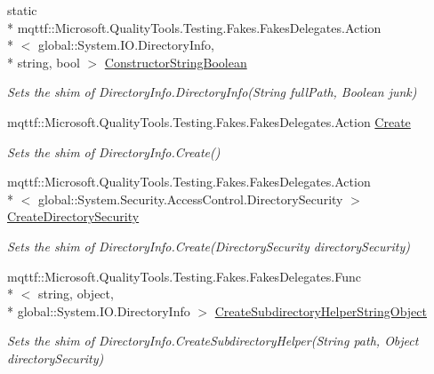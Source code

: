 \begin{DoxyCompactItemize}
static \\*
mqttf\-::\-Microsoft.\-Quality\-Tools.\-Testing.\-Fakes.\-Fakes\-Delegates.\-Action\\*
$<$ global\-::\-System.\-I\-O.\-Directory\-Info, \\*
string, bool $>$ \hyperlink{class_system_1_1_i_o_1_1_fakes_1_1_shim_directory_info_add65e978e8c4420be658b0a033a08abd}{Constructor\-String\-Boolean}
\begin{DoxyCompactList}\small\item\em Sets the shim of Directory\-Info.\-Directory\-Info(\-String full\-Path, Boolean junk)\end{DoxyCompactList}\item 
mqttf\-::\-Microsoft.\-Quality\-Tools.\-Testing.\-Fakes.\-Fakes\-Delegates.\-Action \hyperlink{class_system_1_1_i_o_1_1_fakes_1_1_shim_directory_info_a4253f2442987aa323efab668c26c50d3}{Create}
\begin{DoxyCompactList}\small\item\em Sets the shim of Directory\-Info.\-Create()\end{DoxyCompactList}\item 
mqttf\-::\-Microsoft.\-Quality\-Tools.\-Testing.\-Fakes.\-Fakes\-Delegates.\-Action\\*
$<$ global\-::\-System.\-Security.\-Access\-Control.\-Directory\-Security $>$ \hyperlink{class_system_1_1_i_o_1_1_fakes_1_1_shim_directory_info_ad7279d80b38c229bc09ab4c10b5c8f58}{Create\-Directory\-Security}
\begin{DoxyCompactList}\small\item\em Sets the shim of Directory\-Info.\-Create(\-Directory\-Security directory\-Security)\end{DoxyCompactList}\item 
mqttf\-::\-Microsoft.\-Quality\-Tools.\-Testing.\-Fakes.\-Fakes\-Delegates.\-Func\\*
$<$ string, object, \\*
global\-::\-System.\-I\-O.\-Directory\-Info $>$ \hyperlink{class_system_1_1_i_o_1_1_fakes_1_1_shim_directory_info_a049fe4eb275cab9150a3c9499647a3a3}{Create\-Subdirectory\-Helper\-String\-Object}
\begin{DoxyCompactList}\small\item\em Sets the shim of Directory\-Info.\-Create\-Subdirectory\-Helper(\-String path, Object directory\-Security)\end{DoxyCompactList}\item 

\end{DoxyCompactItemize}
